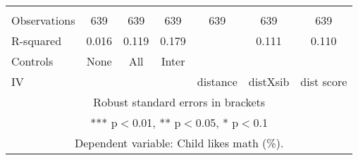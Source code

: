 \begin{tabular}{lcccccc}
 &  &  &  &  &  &  \\
Observations & 639 & 639 & 639 & 639 & 639 & 639 \\
R-squared & 0.016 & 0.119 & 0.179 &  & 0.111 & 0.110 \\
Controls & None & All & Inter &  &  &  \\
 IV &  &  &  & distance & distXsib & dist score \\ \hline
\multicolumn{7}{c}{ Robust standard errors in brackets} \\
\multicolumn{7}{c}{ *** p$<$0.01, ** p$<$0.05, * p$<$0.1} \\
\multicolumn{7}{c}{ Dependent variable: Child likes math (\%).} \\
\end{tabular}
